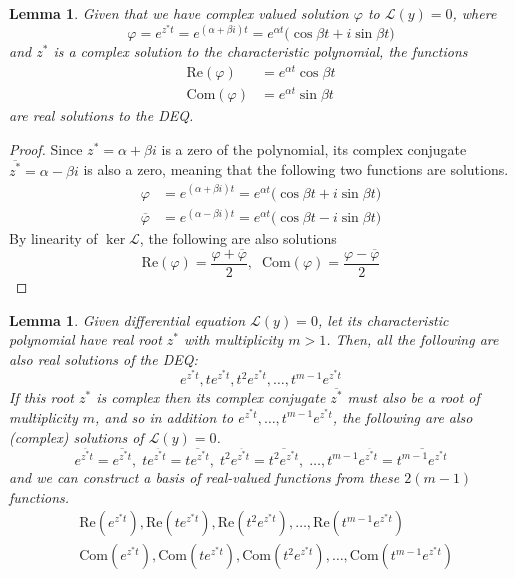 \documentclass{article}
\newtheorem{lemma}[theorem]{Lemma}
\theoremstyle{remark}
\theoremstyle{definition}
\begin{document}
\begin{lemma}
Given that we have complex valued solution $\varphi$ to $\mathcal{L}(y) = 0$, where
\[\varphi = e^{z^* t} = e^{(\alpha + \beta i) t} = e^{\alpha t} \big(\cos{\beta t} + i \sin{\beta t}\big)\]
and $z^*$ is a complex solution to the characteristic polynomial, the functions 
\begin{align*}
    \text{Re}(\varphi) & = e^{\alpha t} \cos{\beta t} \\
    \text{Com}(\varphi) & = e^{\alpha t} \sin{\beta t} 
\end{align*}
are real solutions to the DEQ. 
\end{lemma}
\begin{proof}
Since $z^* = \alpha + \beta i$ is a zero of the polynomial, its complex conjugate $\overline{z^*} = \alpha - \beta i$ is also a zero, meaning that the following two functions are solutions. 
\begin{align*}
    \varphi & = e^{(\alpha + \beta i)t} = e^{\alpha t} \big( \cos{\beta t} + i \sin{\beta t}\big) \\
    \overline{\varphi} & = e^{(\alpha - \beta i)t} = e^{\alpha t} \big(\cos{\beta t} - i \sin{\beta t}\big) 
\end{align*}
By linearity of $\ker{\mathcal{L}}$, the following are also solutions
\[\text{Re}(\varphi) = \frac{\varphi + \overline{\varphi}}{2}, \;\; \text{Com}(\varphi) = \frac{\varphi - \overline{\varphi}}{2}\]
\end{proof}

\begin{lemma}
Given differential equation $\mathcal{L}(y) = 0$, let its characteristic polynomial have real root $z^*$ with multiplicity $m > 1$. Then, all the following are also real solutions of the DEQ:  
\[e^{z^* t}, t e^{z^* t}, t^2 e^{z^* t}, \ldots, t^{m-1} e^{z^* t}\]
If this root $z^*$ is complex then its complex conjugate $\overline{z^*}$ must also be a root of multiplicity $m$, and so in addition to $e^{z^* t}, \ldots, t^{m-1} e^{z^* t}$, the following are also (complex) solutions of $\mathcal{L}(y) = 0$. 
\[e^{\overline{z^*} t} = \overline{e^{z^* t}}, \; t e^{\overline{z^*} t} = \overline{t e^{z^* t}}, \; t^2 e^{\overline{z^*} t} = \overline{t^2 e^{z^* t}}, \; \ldots, t^{m-1} e^{\overline{z^*} t} = \overline{t^{m-1} e^{z^* t}}\]
and we can construct a basis of real-valued functions from these $2 (m-1)$ functions. 
\begin{align*}
    &\text{Re}(e^{z^* t}), \text{Re}(t e^{z^* t}), \text{Re}(t^2 e^{z^* t}), \ldots,  \text{Re}(t^{m-1} e^{z^* t}) \\
    &\text{Com}(e^{z^* t}), \text{Com}(t e^{z^* t}), \text{Com}(t^2 e^{z^* t}), \ldots, \text{Com}(t^{m-1} e^{z^* t})
\end{align*}
\end{lemma}
\end{document}
